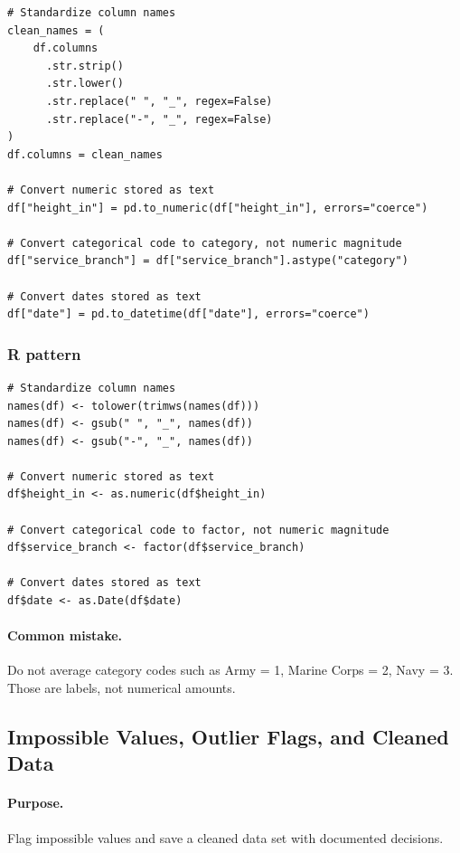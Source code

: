 \begin{verbatim}
# Standardize column names
clean_names = (
    df.columns
      .str.strip()
      .str.lower()
      .str.replace(" ", "_", regex=False)
      .str.replace("-", "_", regex=False)
)
df.columns = clean_names

# Convert numeric stored as text
df["height_in"] = pd.to_numeric(df["height_in"], errors="coerce")

# Convert categorical code to category, not numeric magnitude
df["service_branch"] = df["service_branch"].astype("category")

# Convert dates stored as text
df["date"] = pd.to_datetime(df["date"], errors="coerce")
\end{verbatim}

\subsubsection*{R pattern}

\begin{verbatim}
# Standardize column names
names(df) <- tolower(trimws(names(df)))
names(df) <- gsub(" ", "_", names(df))
names(df) <- gsub("-", "_", names(df))

# Convert numeric stored as text
df$height_in <- as.numeric(df$height_in)

# Convert categorical code to factor, not numeric magnitude
df$service_branch <- factor(df$service_branch)

# Convert dates stored as text
df$date <- as.Date(df$date)
\end{verbatim}

\paragraph{Common mistake.} Do not average category codes such as Army = 1, Marine Corps = 2, Navy = 3.  Those are labels, not numerical amounts.

\subsection{Impossible Values, Outlier Flags, and Cleaned Data}
\label{app:ch03-software-cookbook-impossible-outliers-save}

\paragraph{Purpose.} Flag impossible values and save a cleaned data set with documented decisions.

